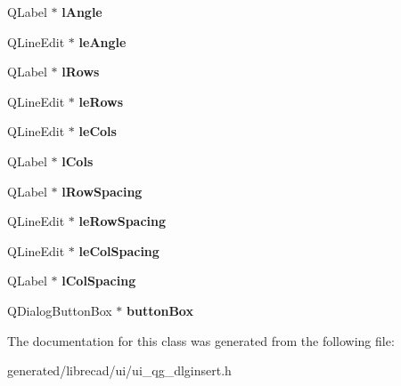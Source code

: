 \begin{DoxyCompactItemize}
\item 
\hypertarget{classUi__QG__DlgInsert_af429b955e59d874c68f8f247572a85e0}{Q\-Label $\ast$ {\bfseries l\-Angle}}\label{classUi__QG__DlgInsert_af429b955e59d874c68f8f247572a85e0}

\item 
\hypertarget{classUi__QG__DlgInsert_a1f3f66380189bed6ce62dbc9db717f98}{Q\-Line\-Edit $\ast$ {\bfseries le\-Angle}}\label{classUi__QG__DlgInsert_a1f3f66380189bed6ce62dbc9db717f98}

\item 
\hypertarget{classUi__QG__DlgInsert_a372f00c16d69c017322e4142e8ac376c}{Q\-Label $\ast$ {\bfseries l\-Rows}}\label{classUi__QG__DlgInsert_a372f00c16d69c017322e4142e8ac376c}

\item 
\hypertarget{classUi__QG__DlgInsert_a429f0214cc726224a9f87b5622bc182b}{Q\-Line\-Edit $\ast$ {\bfseries le\-Rows}}\label{classUi__QG__DlgInsert_a429f0214cc726224a9f87b5622bc182b}

\item 
\hypertarget{classUi__QG__DlgInsert_ac8ffa1f7865545bfecf47073dfa5d92e}{Q\-Line\-Edit $\ast$ {\bfseries le\-Cols}}\label{classUi__QG__DlgInsert_ac8ffa1f7865545bfecf47073dfa5d92e}

\item 
\hypertarget{classUi__QG__DlgInsert_a5e494752e136de83e6ff34f3f179f90d}{Q\-Label $\ast$ {\bfseries l\-Cols}}\label{classUi__QG__DlgInsert_a5e494752e136de83e6ff34f3f179f90d}

\item 
\hypertarget{classUi__QG__DlgInsert_a67f0132058f63feddae9cd1fefa8cc63}{Q\-Label $\ast$ {\bfseries l\-Row\-Spacing}}\label{classUi__QG__DlgInsert_a67f0132058f63feddae9cd1fefa8cc63}

\item 
\hypertarget{classUi__QG__DlgInsert_a90bcffa30d77a5e6a5a8b6609ccbb7c9}{Q\-Line\-Edit $\ast$ {\bfseries le\-Row\-Spacing}}\label{classUi__QG__DlgInsert_a90bcffa30d77a5e6a5a8b6609ccbb7c9}

\item 
\hypertarget{classUi__QG__DlgInsert_a877f2d7345ee0092e86cb1b6bff1169e}{Q\-Line\-Edit $\ast$ {\bfseries le\-Col\-Spacing}}\label{classUi__QG__DlgInsert_a877f2d7345ee0092e86cb1b6bff1169e}

\item 
\hypertarget{classUi__QG__DlgInsert_aee639f437562e8fa96b09428ea2452bf}{Q\-Label $\ast$ {\bfseries l\-Col\-Spacing}}\label{classUi__QG__DlgInsert_aee639f437562e8fa96b09428ea2452bf}

\item 
\hypertarget{classUi__QG__DlgInsert_a23325de7598db9fbc006d395f9909b1c}{Q\-Dialog\-Button\-Box $\ast$ {\bfseries button\-Box}}\label{classUi__QG__DlgInsert_a23325de7598db9fbc006d395f9909b1c}

\end{DoxyCompactItemize}


The documentation for this class was generated from the following file\-:\begin{DoxyCompactItemize}
\item 
generated/librecad/ui/ui\-\_\-qg\-\_\-dlginsert.\-h\end{DoxyCompactItemize}
